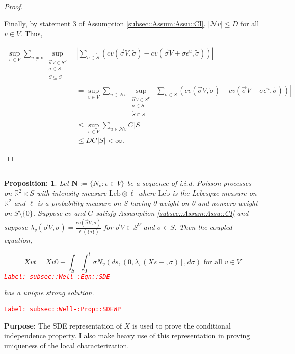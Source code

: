 \documentclass[12pt]{article}
\newcommand{\mb}{\mathbb}
\newcommand{\mc}{\mathcal}
\newcommand{\te}{\text}
\newcommand{\ep}{\epsilon}
\newcommand{\tr}{\textcolor{red}}
\newcommand{\labe}[1]{\tr{\texttt{Label: #1}}}
\newcommand{\purpose}{\textbf{Purpose: }}
\newcommand{\lin}{\rule{\linewidth}{0.4 pt}}
\newcommand{\defeq}{:=}								%
\newcommand{\neigh}{\mc{N}}					%
\renewcommand{\v}{v}							%
\newcommand{\vv}{u}								%
\renewcommand{\S}{S}							%
\newcommand{\s}{\sigma}							%
\newcommand{\sv}{\vec{\s}}						%
\newcommand{\ev}[1]{\ep^{#1}}					%
\renewcommand{\t}{t}							%
\renewcommand{\tt}{s}							%
\newcommand{\X}{X}								%
\newcommand{\IGr}{c}							%
\renewcommand{\ss}[1]{^{#1}}					%
\newcommand{\degr}{D}								%
\newcommand{\poiss}[1]{N_{#1}}						%
\newcommand{\poisses}{\mathbf{N}}				%
\newcommand{\leb}{\te{Leb}}							%
\renewcommand{\SS}{\tilde{\S}}						%
\renewcommand{\ss}{\tilde{\s}}					%
\renewcommand{\G}{G}								%
\newcommand{\V}{V}									%
\newcommand{\XState}[1]{\S^{#1}}				%
\newcommand{\rate}[1]{\lambda_{#1}}					%
\newcommand{\const}[1]{C_{#1}}						%
\newcommand{\Sm}{\ell}								%
\newtheorem{prop}[thms]{Proposition: }
\begin{document}
\begin{proof}
\begin{enumerate}[i)]
Finally, by statement 3 of Assumption \ref{subsec::Assum:Assu::CI}, \(|\neigh{\v}| \leq \degr\) for all \(\v \in \V\). Thus,

\begin{align*}
\sup_{\v\in \V}\sum_{\vv \neq \v} \sup_{\substack{\sv{}{\V} \in \S^\V\\ \s\in \S\\ \SS\subseteq \S}}& \left|\sum_{\ss \in \SS} (\IGr{\v}(\sv{}{\V},\ss) - \IGr{\v}(\sv{}{\V}+\s\ev{\vv},\ss))\right|\\
&  = \sup_{\v\in \V}\sum_{\vv\in \neigh{\v}} \sup_{\substack{\sv{}{\V} \in \S^\V\\ \s\in \S\\ \SS\subseteq \S}} \left|\sum_{\ss \in \SS} (\IGr{\v}(\sv{}{\V},\ss) - \IGr{\v}(\sv{}{\V}+\s\ev{\vv},\ss))\right|\\
&\leq \sup_{\v\in \V} \sum_{\vv \in \neigh{\v}} \const{}|\S|\\
&\leq \degr \const{}|\S| < \infty.
\end{align*}


\end{enumerate}
\end{proof}

\lin

\begin{prop}
Let \(\poisses \defeq \{\poiss{\v}:\v\in \V\}\) be a sequence of i.i.d. Poisson processes on \(\mb{R}^2\times \S\) with intensity measure \(\leb\otimes \Sm\) where \(\leb\) is the Lebesgue measure on \(\mb{R}^2\) and \(\Sm\) is a probability measure on \(\S\) having 0 weight on 0 and nonzero weight on \(\S\setminus \{0\}\). Suppose \(\IGr{\v}\) and \(\G\) satisfy Assumption \ref{subsec::Assum:Assu::CI} and suppose \(\rate{\v}(\sv{}{\V},\s) = \frac{\IGr{\v}(\sv{}{\V},\s)}{\Sm(\{\s\})}\) for \(\sv{}{\V} \in \S^\V\) and \(\s \in \S\). Then the coupled equation,

\begin{equation}
\X{\v}{\t} = \X{\v}{0} + \int_\S\int_0^\t \s\poiss{\v}\left(d\tt,\left(0,\rate{\v}(\X{}{\tt-},\s)\right],d\s\right) \te{ for all }\v \in \V
\label{subsec::Well-:Eqn::SDE}
\end{equation}
\labe{subsec::Well-:Eqn::SDE}

has a unique strong solution.
\label{subsec::Well-:Prop::SDEWP}
\end{prop}
\labe{subsec::Well-:Prop::SDEWP}

\purpose The SDE representation of \(\X{}{}\) is used to prove the conditional independence property. I also make heavy use of this representation in proving uniqueness of the local characterization.
\end{document}

